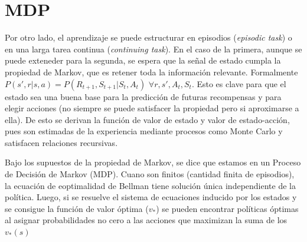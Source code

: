 \documentclass[11pt,a4paper]{article}
\begin{document}
\section{MDP}
Por otro lado, el aprendizaje se puede estructurar en episodios (\textit{episodic task}) o en una larga tarea continua (\textit{continuing task}). En el caso de la primera, aunque se puede exteneder para la segunda, se espera que la señal de estado cumpla la propiedad de Markov, que es retener toda la información relevante. Formalmente $P(s',r|s,a)=P(R_{t+1},S_{t+1}|S_t,A_t)$ $ \forall r,s',A_t,S_t $. Esto es clave para que el estado sea una buena base para la predicción de futuras recompensas y para elegir acciones (no siempre se puede satisfacer la propiedad pero si aproximarse a ella). De esto se derivan la función de valor de estado y valor de estado-acción, pues son estimadas de la experiencia mediante procesos como Monte Carlo y satisfacen relaciones recursivas. 

Bajo los supuestos de la propiedad de Markov, se dice que estamos en un Proceso de Decisión de Markov (MDP). Cuano son finitos (cantidad finita de episodios), la ecuación de eoptimalidad de Bellman tiene solución única independiente de la política. Luego, si se resuelve el sistema de ecuaciones inducido por los estados y se consigue la función de valor óptima ($v_*$) se pueden encontrar políticas óptimas al asignar probabilidades no cero a las acciones que maximizan la suma de los $v_*(s)$
\end{document}
